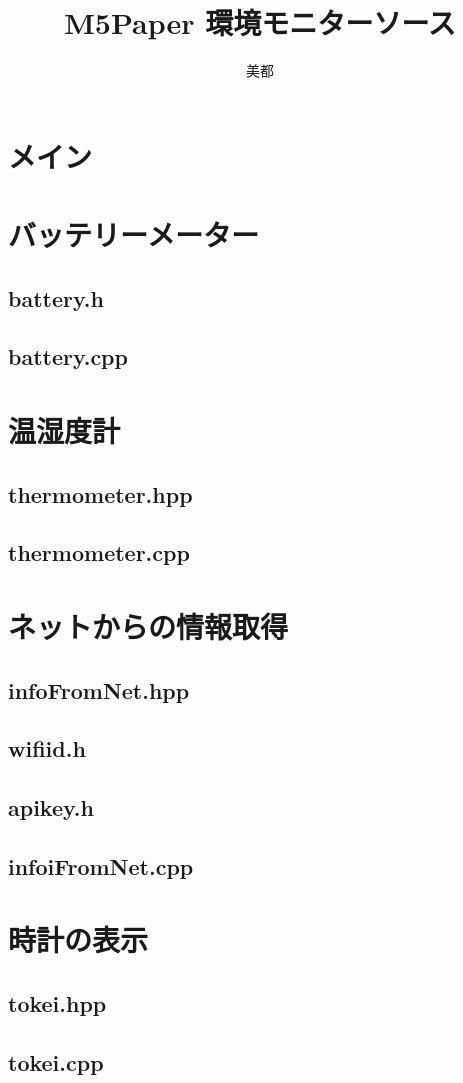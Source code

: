 \documentclass[a4paper, 10pt]{ltjsarticle}
\title{M5Paper 環境モニターソース}
\author{美都}
\begin{document}
\maketitle
\tableofcontents
\clearpage

\section {メイン}

\clearpage
\section {バッテリーメーター}
\subsection {battery.h}

\subsection {battery.cpp}

\clearpage

\section{温湿度計}
\subsection{thermometer.hpp}

\subsection{thermometer.cpp}

\clearpage

\section{ネットからの情報取得}
\subsection{infoFromNet.hpp}

\subsection{wifiid.h}

\subsection{apikey.h}

\subsection{infoiFromNet.cpp}

\clearpage

\section{時計の表示}
\subsection{tokei.hpp}

\subsection{tokei.cpp}

\end{document}
